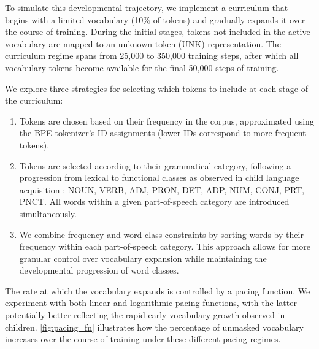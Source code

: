 To simulate this developmental trajectory, we implement a curriculum that begins with a limited vocabulary (10\% of tokens) and gradually expands it over the course of training. During the initial stages, tokens not included in the active vocabulary are mapped to an unknown token (\textsc{UNK}) representation. The curriculum regime spans from 25,000 to 350,000 training steps, after which all vocabulary tokens become available for the final 50,000 steps of training.

We explore three strategies for selecting which tokens to include at each stage of the curriculum:

\begin{enumerate}
    \item {} Tokens are chosen based on their frequency in the corpus, approximated using the BPE tokenizer's ID assignments (lower IDs correspond to more frequent tokens).
    
    \item {} Tokens are selected according to their grammatical category, following a progression from lexical to functional classes as observed in child language acquisition \cite{bergelson2015early}: NOUN, VERB, ADJ, PRON, DET, ADP, NUM, CONJ, PRT, PNCT. All words within a given part-of-speech category are introduced simultaneously.
    
    \item {} We combine frequency and word class constraints by sorting words by their frequency within each part-of-speech category. This approach allows for more granular control over vocabulary expansion while maintaining the developmental progression of word classes.
\end{enumerate}

The rate at which the vocabulary expands is controlled by a pacing function. We experiment with both linear and logarithmic pacing functions, with the latter potentially better reflecting the rapid early vocabulary growth observed in children. \cref{fig:pacing_fn} illustrates how the percentage of unmasked vocabulary increases over the course of training under these different pacing regimes.

